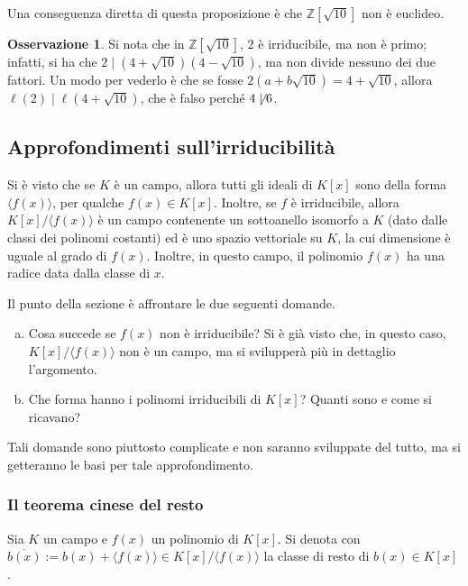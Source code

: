 \documentclass[11pt, a4paper]{scrartcl}
\theoremstyle{definition}
\numberwithin{esempio}{section}
\theoremstyle{definition}
\newtheorem{obs}{Osservazione}
\numberwithin{obs}{section}
\numberwithin{nota}{section}
\numberwithin{equation}{subsection}
\begin{document}
\noindent Una conseguenza diretta di questa proposizione \`e che $\mathbb{Z}[\sqrt{10} ]$ non \`e euclideo.
\begin{obs}
	Si nota che in $\mathbb{Z}[\sqrt{10} ]$, $2$ \`e irriducibile, ma non \`e primo; infatti, si ha che $2  \mid (4 + \sqrt{10} ) (4 - \sqrt{10} )$, ma non divide nessuno dei due fattori.
	Un modo per vederlo \`e che se fosse $2 (a + b \sqrt{10} ) = 4 + \sqrt{10} $, allora $\ell (2)  \mid \ell (4 + \sqrt{10} ) $, che \`e falso perch\'e $4 \not  \mid 6$.
\end{obs}
\subsection{Approfondimenti sull'irriducibilit\`a}
Si \`e visto che se $K$ \`e un campo, allora tutti gli ideali di $K[x]$ sono della forma $\langle f(x) \rangle$, per qualche $f(x) \in K[x]$.
Inoltre, se $f$ \`e irriducibile, allora $K[x] / \langle f(x) \rangle$ \`e un campo contenente un sottoanello isomorfo a $K$ (dato dalle classi dei polinomi costanti) ed \`e uno spazio vettoriale su $K$, la cui dimensione \`e uguale al grado di $f(x)$.
Inoltre, in questo campo, il polinomio $f(x)$ ha una radice data dalla classe di $x$.

Il punto della sezione \`e affrontare le due seguenti domande.
\begin{enumerate}[(a).]
	\item Cosa succede se $f(x)$ non \`e irriducibile? Si \`e gi\`a visto che, in questo caso, $K[x] / \langle f(x) \rangle$ non \`e un campo, ma si svilupper\`a pi\`u in dettaglio l'argomento.
	\item Che forma hanno i polinomi irriducibili di $K[x]$? Quanti sono e come si ricavano?
\end{enumerate}
Tali domande sono piuttosto complicate e non saranno sviluppate del tutto, ma si getteranno le basi per tale approfondimento.
\subsubsection{Il teorema cinese del resto}

Sia $K$ un campo e $f(x)$ un polinomio di $K[x]$. 
Si denota con $\overline{b(x)} := b(x) + \langle f(x) \rangle \in K[x] / \langle f(x) \rangle$ la classe di resto di $b(x) \in K[x]$.
\end{document}
